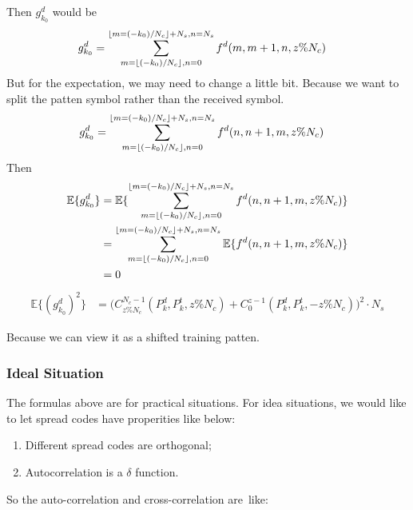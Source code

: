 \documentclass[a4paper]{report}
\DeclarePairedDelimiter\floor{\lfloor}{\rfloor}
\begin{document}
Then $g_{k_0}^d$ would be 
\begin{align}
	g^d_{k_0}
	&= \sum_{m = \floor{(-k_0)/N_c}, n = 0}^{\floor{m=(-k_0)/N_c} + N_s, n = N_s} f^d(m, m+1, n, z\%N_c)
\end{align}
But for the expectation, we may need to change a little bit. Because we want to split the patten symbol rather than the received symbol.
\begin{align}
	g^d_{k_0}
	&= \sum_{m = \floor{(-k_0)/N_c}, n = 0}^{\floor{m=(-k_0)/N_c} + N_s, n = N_s} f^d(n, n+1, m, z\%N_c)
\end{align}
Then
\begin{align}
	\mathbb{E}\{g^d_{k_0}\} 
	&= \mathbb{E}\{\sum_{m = \floor{(-k_0)/N_c}, n = 0}^{\floor{m=(-k_0)/N_c} + N_s, n = N_s} f^d(n, n+1, m, z\%N_c)\}\\
	&= \sum_{m = \floor{(-k_0)/N_c}, n = 0}^{\floor{m=(-k_0)/N_c} + N_s, n = N_s} \mathbb{E}\{f^d(n, n+1, m, z\%N_c)\}\\
	&= 0
\end{align}
\begin{align}
	\mathbb{E} \{(g^d_{k_0})^2\}
	&= \bigg(C_{z\%N_c}^{N_c-1}(P^d_k, P^t_k, z\%N_c) + C_0^{z-1}(P^d_k, P^t_k, -z\%N_c)\bigg)^2 \cdot N_s
\end{align}

Because we can view it as a shifted training patten.


\subsubsection{Ideal Situation} %
\label{ssub:ideal_situation}

The formulas above are for practical situations. For idea situations, we would like to let spread codes have properities like below:

\begin{enumerate}
	\item Different spread codes are orthogonal;
	\item Autocorrelation is a $\delta$ function.
\end{enumerate}

So the auto-correlation and cross-correlation are like:
\end{document}
